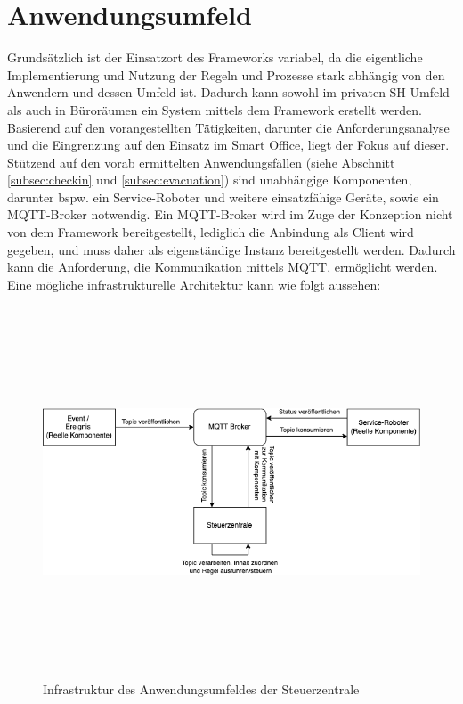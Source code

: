 \section{Anwendungsumfeld}
\label{sec:anwendungsumfeld}
    Grundsätzlich ist der Einsatzort des Frameworks variabel, da die eigentliche Implementierung und Nutzung der Regeln und Prozesse stark 
    abhängig von den Anwendern und dessen Umfeld ist. Dadurch kann sowohl im privaten \acl{SH} Umfeld als auch in Büroräumen ein System mittels dem 
    Framework erstellt werden. Basierend auf den vorangestellten Tätigkeiten, darunter die Anforderungsanalyse und die Eingrenzung auf den 
    Einsatz im Smart Office, liegt der Fokus auf dieser. %
    \\
    \linebreak
    Stützend auf den vorab ermittelten Anwendungsfällen (siehe Abschnitt \ref{subsec:checkin} und \ref{subsec:evacuation}) sind unabhängige 
    Komponenten, darunter bspw. ein Service-Roboter und weitere einsatzfähige Geräte, sowie ein \acs{MQTT}-Broker notwendig. Ein \acs{MQTT}-Broker 
    wird im Zuge der Konzeption nicht von dem Framework bereitgestellt, lediglich die Anbindung als Client wird gegeben, und muss daher als eigenständige 
    Instanz bereitgestellt werden. Dadurch kann die Anforderung, die Kommunikation mittels \acs{MQTT}, ermöglicht werden. Eine mögliche infrastrukturelle 
    Architektur kann wie folgt aussehen: 
    \begin{figure}[hbt!]
        \centering
        \includegraphics[width=14cm,height=11cm,keepaspectratio]{images/Systemarchitektur.png}
        \caption{Infrastruktur des Anwendungsumfeldes der Steuerzentrale}
        \label{fig:infrastructure}
    \end{figure}


